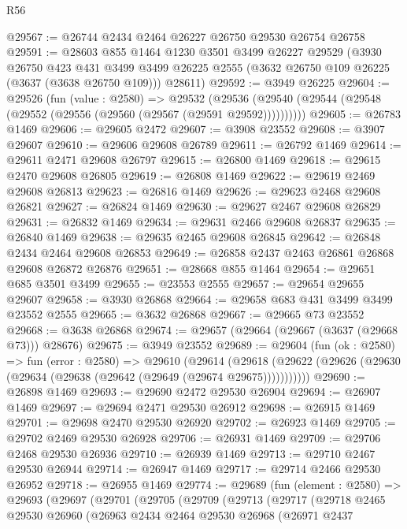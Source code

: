 \begin{lexlean}{R56}
\begin{coremodule}
@29567 := @26744 @2434 @2464 @26227 @26750 @29530 @26754 @26758
@29591 := @28603
    @855
    @1464
    @1230
    @3501
    @3499
    @26227
    @29529
    (@3930
      @26750
      @423
      @431
      @3499
      @3499
      @26225
      @2555
      (@3632 @26750 @109 @26225 (@3637 (@3638 @26750 @109)))
      @28611)
@29592 := @3949 @26225
@29604 := @29526
    (fun (value : @2580) =>
    @29532 (@29536 (@29540 (@29544 (@29548 (@29552 (@29556 (@29560 (@29567 (@29591 @29592))))))))))
@29605 := @26783 @1469
@29606 := @29605 @2472
@29607 := @3908 @23552
@29608 := @3907 @29607
@29610 := @29606 @29608 @26789
@29611 := @26792 @1469
@29614 := @29611 @2471 @29608 @26797
@29615 := @26800 @1469
@29618 := @29615 @2470 @29608 @26805
@29619 := @26808 @1469
@29622 := @29619 @2469 @29608 @26813
@29623 := @26816 @1469
@29626 := @29623 @2468 @29608 @26821
@29627 := @26824 @1469
@29630 := @29627 @2467 @29608 @26829
@29631 := @26832 @1469
@29634 := @29631 @2466 @29608 @26837
@29635 := @26840 @1469
@29638 := @29635 @2465 @29608 @26845
@29642 := @26848 @2434 @2464 @29608 @26853
@29649 := @26858 @2437 @2463 @26861 @26868 @29608 @26872 @26876
@29651 := @28668 @855 @1464
@29654 := @29651 @685 @3501 @3499
@29655 := @23553 @2555
@29657 := @29654 @29655 @29607
@29658 := @3930 @26868
@29664 := @29658 @683 @431 @3499 @3499 @23552 @2555
@29665 := @3632 @26868
@29667 := @29665 @73 @23552
@29668 := @3638 @26868
@29674 := @29657 (@29664 (@29667 (@3637 (@29668 @73))) @28676)
@29675 := @3949 @23552
@29689 := @29604
    (fun (ok : @2580) =>
    fun (error : @2580) =>
    @29610
      (@29614
        (@29618 (@29622 (@29626 (@29630 (@29634 (@29638 (@29642 (@29649 (@29674 @29675)))))))))))
@29690 := @26898 @1469
@29693 := @29690 @2472 @29530 @26904
@29694 := @26907 @1469
@29697 := @29694 @2471 @29530 @26912
@29698 := @26915 @1469
@29701 := @29698 @2470 @29530 @26920
@29702 := @26923 @1469
@29705 := @29702 @2469 @29530 @26928
@29706 := @26931 @1469
@29709 := @29706 @2468 @29530 @26936
@29710 := @26939 @1469
@29713 := @29710 @2467 @29530 @26944
@29714 := @26947 @1469
@29717 := @29714 @2466 @29530 @26952
@29718 := @26955 @1469
@29774 := @29689
    (fun (element : @2580) =>
    @29693
      (@29697
        (@29701
          (@29705
            (@29709
              (@29713
                (@29717
                  (@29718
                    @2465
                    @29530
                    @26960
                    (@26963
                      @2434
                      @2464
                      @29530
                      @26968
                      (@26971
                        @2437

\end{coremodule}
\end{lexlean}
